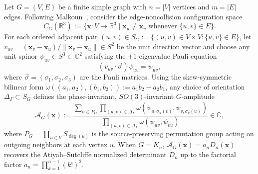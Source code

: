 \documentclass[11pt]{amsart}
\renewcommand{\_}{\origunderscore\penalty0\relax}
\theoremstyle{plain}
\theoremstyle{definition}
\theoremstyle{remark}
\newcommand{\C}{\mathbb{C}}
\newcommand{\R}{\mathbb{R}}
\newcommand{\AG}{\mathcal{A}_G}
\begin{document}
Let $G = (V, E)$ be a finite simple graph with $n = |V|$ vertices and $m = |E|$ edges. Following Malkoun~\cite{Malkoun2026}, consider the edge-noncollision configuration space
\[
    C_G(\R^3) := \bigl\{\mathbf{x} : V \to \R^3 \;\big|\; \mathbf{x}_u \neq \mathbf{x}_v \text{ whenever } \{u, v\} \in E\bigr\}.
\]
For each ordered adjacent pair $(u, v) \in S_G := \{(u, v) \in V \times V : \{u, v\} \in E\}$, let $v_{uv} = (\mathbf{x}_v - \mathbf{x}_u)/\|\mathbf{x}_v - \mathbf{x}_u\| \in S^2$ be the unit direction vector and choose any unit spinor $\psi_{uv} \in S^3 \subset \C^2$ satisfying the $+1$-eigenvalue Pauli equation
\[
    (v_{uv} \cdot \vec{\sigma})\psi_{uv} = \psi_{uv},
\]
where $\vec{\sigma} = (\sigma_1, \sigma_2, \sigma_3)$ are the Pauli matrices. Using the skew-symmetric bilinear form $\omega((a_1, a_2), (b_1, b_2)) := a_1 b_2 - a_2 b_1$, any choice of orientation $\Delta_\Gamma \subset S_G$ defines the phase-invariant, $SO(3)$-invariant $G$-amplitude
\begin{equation}\label{eq:amplitude}
    \AG(\mathbf{x}) := \frac{\sum_{\sigma \in P_G} \prod_{(u, v) \in \Delta_\Gamma} \omega(\psi_{u, \sigma_u(v)}, \psi_{v, \sigma_v(u)})}{\prod_{(u, v) \in \Delta_\Gamma} \omega(\psi_{uv}, \psi_{vu})} \in \C,
\end{equation}
where $P_G = \prod_{u \in V} S_{\deg(u)}$ is the source-preserving permutation group acting on outgoing neighbors at each vertex $u$. When $G = K_n$, $\AG(\mathbf{x}) = a_n D_n(\mathbf{x})$ recovers the Atiyah--Sutcliffe normalized determinant $D_n$ up to the factorial factor $a_n = \prod_{k=1}^{n-1} (k!)^2$.
\end{document}
